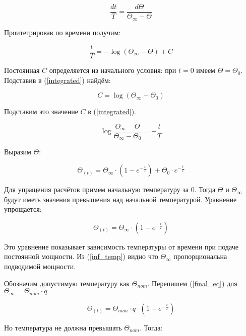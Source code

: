 \documentclass[a4paper]{article}
\begin{document}
\begin{equation}
\label{new_heating}
\frac{dt}{T}=\frac{d\Theta}{\Theta_{\infty}-\Theta}
\end{equation}

Проитегрировав по времени получим:

\begin{equation}
\label{integrated}
\frac{t}{T}=-\log{(\Theta_{\infty}-\Theta)}+C
\end{equation}

Постоянная $C$ определяется из начального условия: при $t=0$ имеем
$\Theta=\Theta_{0}$. Подставив в (\ref{integrated}) найдём:

\begin{equation}
    C=\log{(\Theta_{\infty}-\Theta_{0})}
\end{equation}

Подставим это значение $C$ в (\ref{integrated}).

\begin{equation}
\log{\frac{\Theta_{\infty}-\Theta}{\Theta_{\infty}-\Theta_{0}}}=-\frac{t}{T}
\end{equation}

Выразим $\Theta$:

\begin{equation}
    \Theta_{(t)} = \Theta_{\infty}{\cdot}(1-e^{-\frac{t}{T}}) +
         {\Theta}_{0}{\cdot}e^{-\frac{t}{T}}
\end{equation}

Для упращения расчётов примем начальную температуру за $0$. Тогда $\Theta$
и $\Theta_\infty$ будут иметь значения превышения над начальной температурой.
Уравнение упрощается:

\begin{equation}
\label{final_eq}
\Theta_{(t)} = \Theta_{\infty}{\cdot}(1-e^{-\frac{t}{T}})
\end{equation}

Это уравнение показывает зависимость температуры от времени при подаче постоянной
мощности. Из (\ref{inf_temp}) видно что $\Theta_{\infty}$ пропорциональна подводимой
мощности.

Обозначим допустимую температуру как $\Theta_{nom}$. Перепишем (\ref{final_eq}) для
$\Theta_{\infty}=\Theta_{nom}{\cdot}q$

\begin{equation}
\label{overpowered_eq}
\Theta_{(t)} = \Theta_{nom}{\cdot}q{\cdot}(1-e^{-\frac{t}{T}})
\end{equation}

Но температура не должна превышать $\Theta_{nom}$. Тогда:
\end{document}
